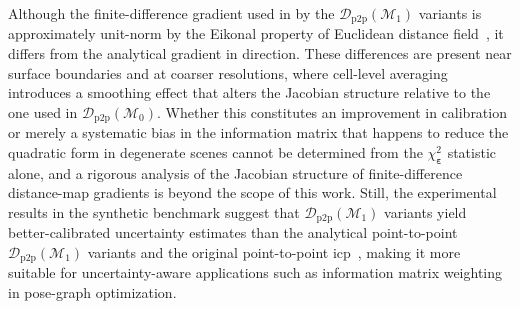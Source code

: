 Although the finite-difference gradient used in by the
$\mathcal{D}_\mathrm{p2p}(\mathcal{M}_1)$ variants is approximately unit-norm by
the Eikonal property of Euclidean distance field~\cite{jones:tvcg:2006}, it
differs from the analytical gradient in direction. These differences are present
near surface boundaries and at coarser resolutions,
where cell-level averaging introduces a smoothing effect that alters the
Jacobian structure relative to the one used in
$\mathcal{D}_\mathrm{p2p}(\mathcal{M}_0)$.
Whether this constitutes an improvement in calibration or merely a systematic
bias in the information matrix that happens to reduce the quadratic form in
degenerate scenes cannot be determined from the
$\chi_{\boldsymbol{\varepsilon}}^2$ statistic alone, and a rigorous analysis
of the Jacobian structure of finite-difference distance-map gradients is beyond
the scope of this work.
Still, the experimental results in the synthetic benchmark suggest that
$\mathcal{D}_\mathrm{p2p}(\mathcal{M}_1)$ variants yield better-calibrated
uncertainty estimates than the analytical point-to-point
$\mathcal{D}_\mathrm{p2p}(\mathcal{M}_1)$ variants and the original
point-to-point \gls{icp}~\cite{besl-mckay:tpami:1992},
making it more suitable for uncertainty-aware applications such as information
matrix weighting in pose-graph optimization.


